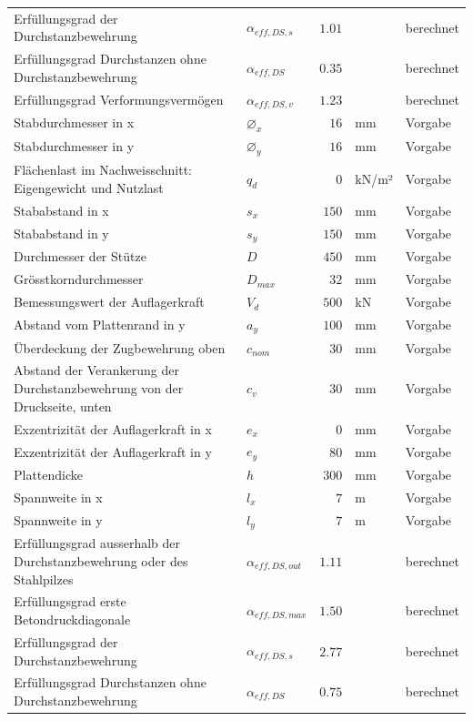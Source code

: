 \documentclass[11pt,a4paper]{article}
\begin{document}
\begin{xltabular}{\linewidth}{>{\raggedright\arraybackslash}Xlrll}
Erfüllungsgrad der Durchstanzbewehrung & $\alpha_{eff,DS,s}$ & $1.01$ &  & berechnet \\
Erfüllungsgrad Durchstanzen ohne Durchstanzbewehrung & $\alpha_{eff,DS}$ & $0.35$ &  & berechnet \\
Erfüllungsgrad Verformungsvermögen & $\alpha_{eff,DS,v}$ & $1.23$ &  & berechnet \\
Stabdurchmesser in x & $\varnothing_x$ & $16$ & mm & Vorgabe \\
Stabdurchmesser in y & $\varnothing_y$ & $16$ & mm & Vorgabe \\
Flächenlast im Nachweisschnitt: Eigengewicht und Nutzlast & $q_d$ & $0$ & kN/m² & Vorgabe \\
Stababstand in x & $s_x$ & $150$ & mm & Vorgabe \\
Stababstand in y & $s_y$ & $150$ & mm & Vorgabe \\
Durchmesser der Stütze & $D$ & $450$ & mm & Vorgabe \\
Grösstkorndurchmesser & $D_{max}$ & $32$ & mm & Vorgabe \\
Bemessungswert der Auflagerkraft & $V_d$ & $500$ & kN & Vorgabe \\
Abstand vom Plattenrand in y & $a_y$ & $100$ & mm & Vorgabe \\
Überdeckung der Zugbewehrung oben & $c_{nom}$ & $30$ & mm & Vorgabe \\
Abstand der Verankerung der Durchstanzbewehrung von der Druckseite, unten & $c_v$ & $30$ & mm & Vorgabe \\
Exzentrizität der Auflagerkraft in x & $e_x$ & $0$ & mm & Vorgabe \\
Exzentrizität der Auflagerkraft in y & $e_y$ & $80$ & mm & Vorgabe \\
Plattendicke & $h$ & $300$ & mm & Vorgabe \\
Spannweite in x & $l_x$ & $7$ & m & Vorgabe \\
Spannweite in y & $l_y$ & $7$ & m & Vorgabe \\
Erfüllungsgrad ausserhalb der Durchstanzbewehrung oder des Stahlpilzes & $\alpha_{eff,DS,out}$ & $1.11$ &  & berechnet \\
Erfüllungsgrad erste Betondruckdiagonale & $\alpha_{eff,DS,max}$ & $1.50$ &  & berechnet \\
Erfüllungsgrad der Durchstanzbewehrung & $\alpha_{eff,DS,s}$ & $2.77$ &  & berechnet \\
Erfüllungsgrad Durchstanzen ohne Durchstanzbewehrung & $\alpha_{eff,DS}$ & $0.75$ &  & berechnet \\

\end{xltabular}
\end{document}
